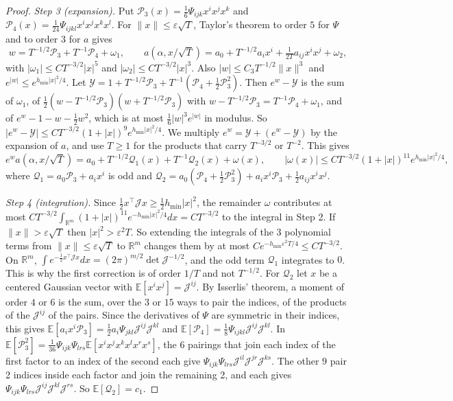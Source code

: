 \begin{proof}
\emph{Step 3 (expansion).} Put
$\mathcal P_3(x)=\frac16\Psi_{ijk}x^ix^jx^k$ and
$\mathcal P_4(x)=\frac1{24}\Psi_{ijkl}x^ix^jx^kx^l$. For
$\lVert x\rVert\le\varepsilon\sqrt T$, Taylor's theorem to order $5$ for
$\Psi$ and to order $3$ for $a$ gives
\[
w=T^{-1/2}\mathcal P_3+T^{-1}\mathcal P_4+\omega_1,\qquad
a(\alpha,x/\sqrt T)=a_0+T^{-1/2}a_ix^i+\tfrac1{2T}a_{ij}x^ix^j+\omega_2,
\]
with $|\omega_1|\le CT^{-3/2}|x|^5$ and $|\omega_2|\le CT^{-3/2}|x|^3$. Also
$|w|\le C_3T^{-1/2}\lVert x\rVert^3$ and $e^{|w|}\le e^{h_{\min}|x|^2/4}$. Let
$\mathcal Y=1+T^{-1/2}\mathcal P_3+T^{-1}(\mathcal P_4+\frac12\mathcal P_3^2)$.
Then $e^w-\mathcal Y$ is the sum of $\omega_1$, of
$\frac12(w-T^{-1/2}\mathcal P_3)(w+T^{-1/2}\mathcal P_3)$ with
$w-T^{-1/2}\mathcal P_3=T^{-1}\mathcal P_4+\omega_1$, and of
$e^w-1-w-\frac12w^2$, which is at most $\frac16|w|^3e^{|w|}$ in modulus. So
$|e^w-\mathcal Y|\le CT^{-3/2}(1+|x|)^9e^{h_{\min}|x|^2/4}$. We multiply
$e^w=\mathcal Y+(e^w-\mathcal Y)$ by the expansion of $a$, and use $T\ge1$
for the products that carry $T^{-3/2}$ or $T^{-2}$. This gives
\[
e^{w}a(\alpha,x/\sqrt T)=a_0+T^{-1/2}\mathcal Q_1(x)+T^{-1}\mathcal Q_2(x)
+\omega(x),\qquad
|\omega(x)|\le CT^{-3/2}(1+|x|)^{11}e^{h_{\min}|x|^2/4},
\]
where $\mathcal Q_1=a_0\mathcal P_3+a_ix^i$ is odd and
$\mathcal Q_2=a_0(\mathcal P_4+\frac12\mathcal P_3^2)+a_ix^i\mathcal P_3
+\frac12a_{ij}x^ix^j$.

\emph{Step 4 (integration).} Since
$\frac12x^\top\mathcal Jx\ge\frac12h_{\min}|x|^2$, the remainder $\omega$
contributes at most
$CT^{-3/2}\int_{\mathbb R^m}(1+|x|)^{11}e^{-h_{\min}|x|^2/4}dx=CT^{-3/2}$ to the
integral in Step 2. If $\lVert x\rVert>\varepsilon\sqrt T$ then
$|x|^2>\varepsilon^2T$. So extending the integrals of the 3 polynomial terms
from $\lVert x\rVert\le\varepsilon\sqrt T$ to $\mathbb R^m$ changes them by at
most $Ce^{-h_{\min}\varepsilon^2T/4}\le CT^{-3/2}$. On $\mathbb R^m$,
$\int e^{-\frac12x^\top\mathcal Jx}dx=(2\pi)^{m/2}\det\mathcal J^{-1/2}$, and the
odd term $\mathcal Q_1$ integrates to $0$. This is why the first correction is
of order $1/T$ and not $T^{-1/2}$. For $\mathcal Q_2$ let $x$ be a centered
Gaussian vector with $\mathbb E[x^ix^j]=\mathcal J^{ij}$. By Isserlis' theorem,
a moment of order $4$ or $6$ is the sum, over the $3$ or $15$ ways to pair the
indices, of the products of the $\mathcal J^{ij}$ of the pairs. Since the
derivatives of $\Psi$ are symmetric in their indices, this gives
$\mathbb E[a_ix^i\mathcal P_3]=\frac12a_i\Psi_{jkl}\mathcal J^{ij}\mathcal J^{kl}$
and $\mathbb E[\mathcal P_4]=\frac18\Psi_{ijkl}\mathcal J^{ij}\mathcal J^{kl}$.
In
$\mathbb E[\mathcal P_3^2]=\frac1{36}\Psi_{ijk}\Psi_{lrs}
\mathbb E[x^ix^jx^kx^lx^rx^s]$, the $6$ pairings that join each index of the
first factor to an index of the second each give
$\Psi_{ijk}\Psi_{lrs}\mathcal J^{il}\mathcal J^{jr}\mathcal J^{ks}$. The other
$9$ pair 2 indices inside each factor and join the remaining 2, and each gives
$\Psi_{ijk}\Psi_{lrs}\mathcal J^{ij}\mathcal J^{kl}\mathcal J^{rs}$. So
$\mathbb E[\mathcal Q_2]=c_1$.


\end{proof}
